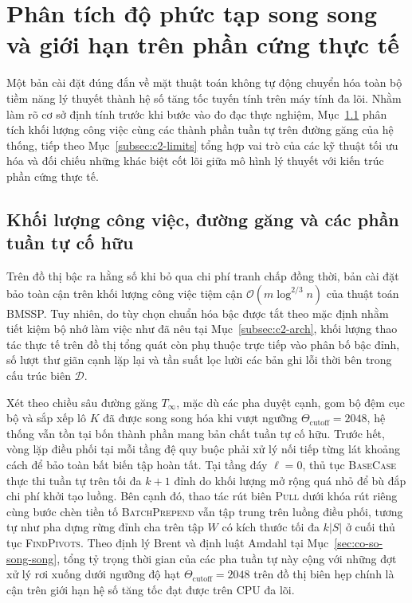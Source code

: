 \section{Phân tích độ phức tạp song song và giới hạn trên phần cứng thực tế}\label{sec:c2-phan-tich}

Một bản cài đặt đúng đắn về mặt thuật toán không tự động chuyển hóa toàn bộ tiềm năng lý thuyết thành hệ số tăng tốc tuyến tính trên máy tính đa lõi. Nhằm làm rõ cơ sở định tính trước khi bước vào đo đạc thực nghiệm, Mục~\ref{subsec:c2-complexity} phân tích khối lượng công việc cùng các thành phần tuần tự trên đường găng của hệ thống, tiếp theo Mục~\ref{subsec:c2-limits} tổng hợp vai trò của các kỹ thuật tối ưu hóa và đối chiếu những khác biệt cốt lõi giữa mô hình lý thuyết với kiến trúc phần cứng thực tế.

\subsection{Khối lượng công việc, đường găng và các phần tuần tự cố hữu}\label{subsec:c2-complexity}

Trên đồ thị bậc ra hằng số khi bỏ qua chi phí tranh chấp đồng thời, bản cài đặt bảo toàn cận trên khối lượng công việc tiệm cận $\mathcal{O}(m \log^{2/3} n)$ của thuật toán BMSSP. Tuy nhiên, do tùy chọn chuẩn hóa bậc được tắt theo mặc định nhằm tiết kiệm bộ nhớ làm việc như đã nêu tại Mục~\ref{subsec:c2-arch}, khối lượng thao tác thực tế trên đồ thị tổng quát còn phụ thuộc trực tiếp vào phân bố bậc đỉnh, số lượt thư giãn cạnh lặp lại và tần suất lọc lười các bản ghi lỗi thời bên trong cấu trúc biên $\mathcal{D}$.

Xét theo chiều sâu đường găng $T_\infty$, mặc dù các pha duyệt cạnh, gom bộ đệm cục bộ và sắp xếp lô $K$ đã được song song hóa khi vượt ngưỡng $\Theta_{\mathrm{cutoff}} = 2048$, hệ thống vẫn tồn tại bốn thành phần mang bản chất tuần tự cố hữu. Trước hết, vòng lặp điều phối tại mỗi tầng đệ quy buộc phải xử lý nối tiếp từng lát khoảng cách để bảo toàn bất biến tập hoàn tất. Tại tầng đáy $\ell = 0$, thủ tục \textsc{BaseCase} thực thi tuần tự trên tối đa $k + 1$ đỉnh do khối lượng mở rộng quá nhỏ để bù đắp chi phí khởi tạo luồng. Bên cạnh đó, thao tác rút biên \textsc{Pull} dưới khóa rút riêng cùng bước chèn tiền tố \textsc{BatchPrepend} vẫn tập trung trên luồng điều phối, tương tự như pha dựng rừng đỉnh cha trên tập $W$ có kích thước tối đa $k|S|$ ở cuối thủ tục \textsc{FindPivots}. Theo định lý Brent và định luật Amdahl tại Mục~\ref{sec:co-so-song-song}, tổng tỷ trọng thời gian của các pha tuần tự này cộng với những đợt xử lý rơi xuống dưới ngưỡng độ hạt $\Theta_{\mathrm{cutoff}} = 2048$ trên đồ thị biên hẹp chính là cận trên giới hạn hệ số tăng tốc đạt được trên CPU đa lõi.

